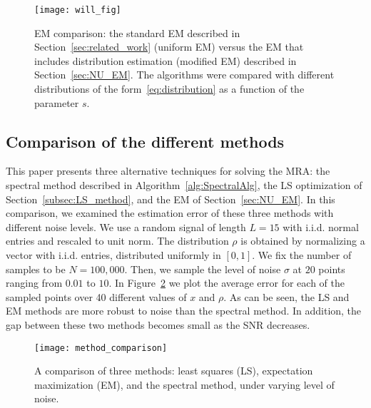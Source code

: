 \documentclass{IEEEtran}
\numberwithin{equation}{section}
\numberwithin{figure}{section}
\theoremstyle{plain}
\theoremstyle{definition}
\theoremstyle{remark}
\theoremstyle{plain}
\theoremstyle{remark}
\theoremstyle{plain}
\theoremstyle{plain}
\theoremstyle{remark}
\begin{document}
%
%
\begin{figure}[ht]
    \centerline{
        \texttt{[image: will\_fig]}
    }
    \caption{EM comparison: the standard EM described in Section~\ref{sec:related_work} (uniform EM) versus the EM that includes distribution estimation (modified EM) described in Section~\ref{sec:NU_EM}. The algorithms were compared with different distributions of the form~\ref{eq:distribution} as a function of the parameter $s$. }
    \label{fig:EM_comparison}
\end{figure}



\subsection{Comparison of the different methods}

This paper presents three alternative techniques for solving the MRA: the spectral method described in Algorithm~\ref{alg:SpectralAlg}, the LS optimization of Section~\ref{subsec:LS_method}, and the EM of Section~\ref{sec:NU_EM}. In this comparison, we examined the estimation error of these three methods with different noise levels. We use a random signal of length $L=15$ with i.i.d. normal entries and rescaled to unit norm. The distribution $\rho$ is obtained by normalizing a vector with i.i.d. entries, distributed uniformly in $[0,1]$. We fix the number of samples to be $N=100,000$. Then, we sample the level of noise $\sigma$ at $20$ points ranging from $0.01$ to $10$. In Figure~\ref{fig:overall_comparison} we plot the average error for each of the sampled points over 40 different values of $x$ and $\rho$. As can be seen, the LS and EM methods are more robust to noise than the spectral method. In addition, the gap between these two methods becomes small as the SNR decreases.


%
%
\begin{figure}[ht]
    \centerline{
        \texttt{[image: method\_comparison]}
    }
    \caption{A comparison of three methods: least squares (LS), expectation maximization (EM), and the spectral method, under varying level of noise.}
    \label{fig:overall_comparison}
\end{figure}
\end{document}

